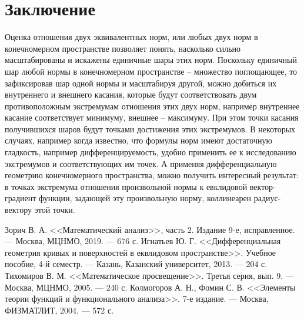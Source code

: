 \documentclass{article}
\begin{document}
\newpage
\section{Заключение}
Оценка отношения двух эквивалентных норм, или любых двух норм в конечномерном пространстве позволяет понять, насколько сильно масштабированы и искажены единичные шары этих норм. Поскольку единичный шар любой нормы в конечномерном пространстве -- множество поглощающее, то зафиксировав шар одной нормы и масштабируя другой, можно добиться их внутреннего и внешнего касания, которые будут соответствовать двум противоположным экстремумам отношения этих двух норм, например внутреннее касание соответствует минимуму, внешнее -- максимуму. При этом точки касания получившихся шаров будут точками достижения этих экстремумов.
\newline
В некоторых случаях, например когда известно, что формулы норм имеют достаточную гладкость, например дифференцируемость, удобно применить ее к исследованию экстремумов и соответствующих им точек. А применяя дифференциальную геометрию конечномерного пространства, можно получить интересный результат: в точках экстремума отношения произвольной нормы к евклидовой вектор-градиент функции, задающей эту произвольную норму, коллинеарен радиус-вектору этой точки.

\newpage
\begin{thebibliography}{9}
Зорич В. А. <<Математический анализ>>, часть 2. Издание 9-е, исправленное. --- Москва, МЦНМО, 2019. --- 676 с.
Игнатьев Ю. Г. <<Дифференциальная геометрия кривых и поверхностей в еквлидовом пространстве>>. Учебное пособие, 4-й семестр. --- Казань, Казанский университет, 2013. --- 204 с.
Тихомиров В. М. <<Математическое просвещение>>. Третья серия, вып. 9. --- Москва, МЦНМО, 2005. --- 240 с.
Колмогоров А. Н., Фомин С. В. <<Элементы теории функций и функционального анализа>>. 7-е издание. --- Москва, ФИЗМАТЛИТ, 2004. --- 572 с.
\end{thebibliography}
\end{document}
